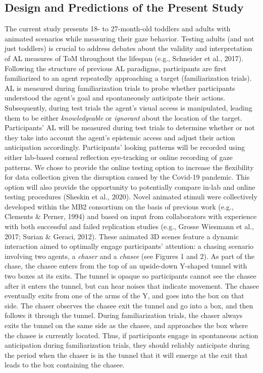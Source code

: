 \documentclass[
  english,
  man,floatsintext]{apa6}
\begin{document}
\hypertarget{design-and-predictions-of-the-present-study}{%
\subsection{Design and Predictions of the Present Study}\label{design-and-predictions-of-the-present-study}}

The current study presents 18- to 27-month-old toddlers and adults with animated scenarios while measuring their gaze behavior. Testing adults (and not just toddlers) is crucial to address debates about the validity and interpretation of AL measures of ToM throughout the lifespan (e.g., Schneider et al., 2017). Following the structure of previous AL paradigms, participants are first familiarized to an agent repeatedly approaching a target (familiarization trials). AL is measured during familiarization trials to probe whether participants understood the agent's goal and spontaneously anticipate their actions. Subsequently, during test trials the agent's visual access is manipulated, leading them to be either \emph{knowledgeable} or \emph{ignorant} about the location of the target. Participants' AL will be measured during test trials to determine whether or not they take into account the agent's epistemic access and adjust their action anticipation accordingly. Participants' looking patterns will be recorded using either lab-based corneal reflection eye-tracking or online recording of gaze patterns. We chose to provide the online testing option to increase the flexibility for data collection given the disruption caused by the Covid-19 pandemic. This option will also provide the opportunity to potentially compare in-lab and online testing procedures (Sheskin et al., 2020).
Novel animated stimuli were collectively developed within the MB2 consortium on the basis of previous work (e.g., Clements \& Perner, 1994) and based on input from collaborators with experience with both successful and failed replication studies (e.g., Grosse Wiesmann et al., 2017; Surian \& Geraci, 2012). These animated 3D scenes feature a dynamic interaction aimed to optimally engage participants' attention: a chasing scenario involving two agents, a \emph{chaser} and a \emph{chasee} (see Figures 1 and 2). As part of the chase, the chasee enters from the top of an upside-down Y-shaped tunnel with two boxes at its exits. The tunnel is opaque so participants cannot see the chasee after it enters the tunnel, but can hear noises that indicate movement. The chasee eventually exits from one of the arms of the Y, and goes into the box on that side. The chaser observes the chasee exit the tunnel and go into a box, and then follows it through the tunnel. During familiarization trials, the chaser always exits the tunnel on the same side as the chasee, and approaches the box where the chasee is currently located. Thus, if participants engage in spontaneous action anticipation during familiarization trials, they should reliably anticipate during the period when the chaser is in the tunnel that it will emerge at the exit that leads to the box containing the chasee.
\end{document}
